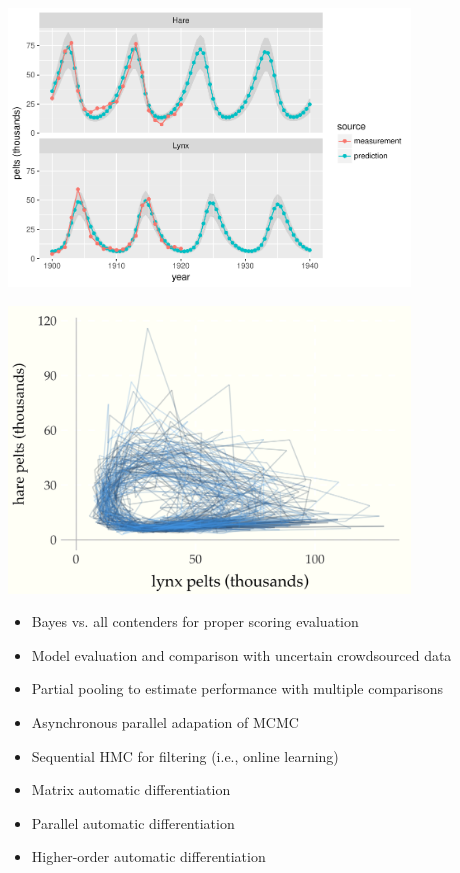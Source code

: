 \documentclass[11pt]{report}
\begin{document}
\begin{center}
\includegraphics[width=0.8\textwidth]{img/lotka-volterra-posterior.pdf}
\end{center}

\begin{center}
\includegraphics[width=0.8\textwidth]{img/lotka-volterra-posterior-time.png}
\end{center}



\begin{itemize}
\item Bayes vs. all contenders for proper scoring evaluation
\item Model evaluation and comparison with uncertain crowdsourced data
\item Partial pooling to estimate performance with multiple comparisons
\end{itemize}

\begin{itemize}
\item Asynchronous parallel adapation of MCMC
\item Sequential HMC for filtering (i.e., online learning)
\item Matrix automatic differentiation
\item Parallel automatic differentiation
\item Higher-order automatic differentiation
\end{itemize}
\end{document}
